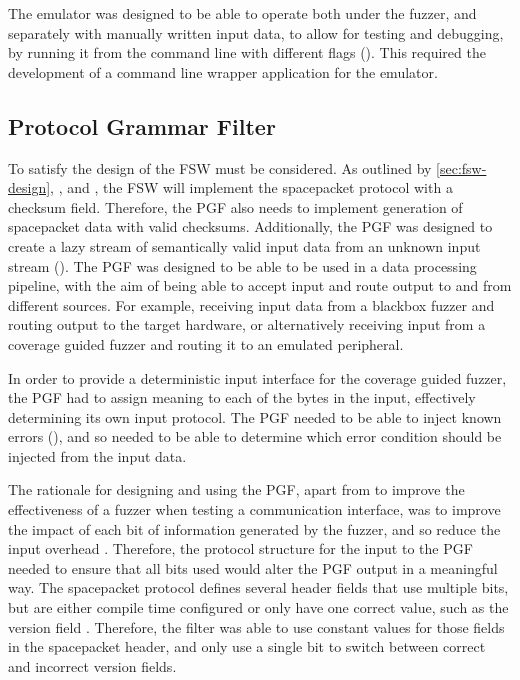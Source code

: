 \documentclass[../report.tex]{subfiles}
\begin{document}
The emulator was designed to be able to operate both under the fuzzer, and
separately with manually written input data, to allow for testing and
debugging, by running it from the command line with different flags
(). This required the development of a command line wrapper
application for the emulator.

\subsection{Protocol Grammar Filter}

To satisfy  the design of the FSW must be considered.
As outlined by \autoref{sec:fsw-design}, , and ,
the FSW will implement the spacepacket protocol with a checksum field.
Therefore, the PGF also needs to implement generation of spacepacket data with
valid checksums. Additionally, the PGF was designed to create a lazy stream of
semantically valid input data from an unknown input stream ().
The PGF was designed to be able to be used in a data processing pipeline, with
the aim of being able to accept input and route output to and from different
sources. For example, receiving input data from a blackbox fuzzer and routing
output to the target hardware, or alternatively receiving input from a coverage
guided fuzzer and routing it to an emulated peripheral.

In order to provide a deterministic input interface for the coverage guided
fuzzer, the PGF had to assign meaning to each of the bytes in the input,
effectively determining its own input protocol. The PGF needed to be able to
inject known errors (), and so needed to be able to determine
which error condition should be injected from the input data.

The rationale for designing and using the PGF, apart from to improve the
effectiveness of a fuzzer when testing a communication interface, was to
improve the impact of each bit of information generated by the fuzzer, and so
reduce the input overhead \citep{Fuzzware_2022, Hoedur_2023,
Fuzztruction_2023}. Therefore, the protocol structure for the input to the PGF
needed to ensure that all bits used would alter the PGF output in a meaningful
way. The spacepacket protocol defines several header fields that use multiple
bits, but are either compile time configured or only have one correct value,
such as the version field \citep{Ccsds_spp}. Therefore, the filter was able to
use constant values for those fields in the spacepacket header, and only use a
single bit to switch between correct and incorrect version fields.
\end{document}
